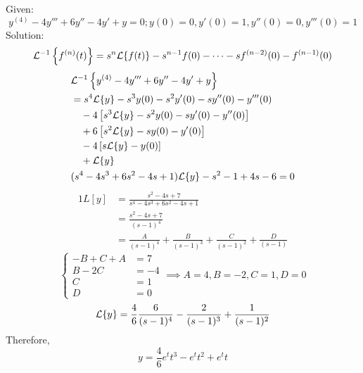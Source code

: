 \documentclass[diffeq.tex]{subfiles}
\begin{document}
\begin{homework*}[255.13]
    Given:
    \begin{equation}
        y^{(4)} - 4y''' + 6y'' - 4y' + y = 0; y(0) = 0, y'(0) = 1, y''(0) = 0, y'''(0) = 1
    \end{equation}
    Solution:
    \begin{equation}
        \mathcal{L}^{-1}\left\{f^{(n)}(t)\right\} = s^{n}\mathcal{L}\{f(t)\} - s^{n-1}f(0) - \dots - sf^{(n - 2)}(0)-f^{(n-1)}(0)
    \end{equation}
    \begin{alignat}{1}
        &\mathcal{L}^{-1}\left\{y^{(4)} - 4y''' + 6y'' - 4y' + y\right\}\\
        &= s^{4}\mathcal{L}\{y\} - s^{3}y(0) - s^{2}y'(0) - sy''(0) - y'''(0)\nonumber\\
        &\quad -4\left[s^{3}\mathcal{L}\{y\} - s^{2}y(0) - sy'(0) -y''(0)\right]\nonumber\\
        &\quad +6\left[s^{2}\mathcal{L}\{y\} - sy(0) - y'(0)\right]\nonumber\\
        &\quad -4\left[s\mathcal{L}\{y\}-y(0)\right]\nonumber\\
        &\quad + \mathcal{L}\{y\}\\
        &(s^{4}-4s^{3}+6s^{2}-4s+1)\mathcal{L}\{y\} - s^{2} - 1 + 4s - 6 = 0
    \end{alignat}
    \begin{alignat}{1}
        L[y] &= \frac{s^{2} - 4s + 7}{s^{4} - 4s^{3}+ 6s^{2} - 4s + 1}\\
        &= \frac{s^{2} - 4s + 7}{(s - 1)^{4}}\\
        &= \frac{A}{(s-1)^{4}} + \frac{B}{(s-1)^{3}} + \frac{C}{(s-1)^{2}} + \frac{D}{(s-1)}
    \end{alignat}
    \begin{equation}
        \begin{cases}
            -B + C + A &= 7\\
            B - 2C &= -4\\
            C &= 1\\
            D &= 0
        \end{cases}
        \implies A = 4, B = -2, C = 1, D = 0
    \end{equation}
    \begin{equation}
        \mathcal{L}\{y\} = \frac{4}{6}\frac{6}{(s - 1)^{4}}-\frac{2}{(s-1)^{3}}+\frac{1}{(s-1)^{2}}
    \end{equation}
    Therefore,
    \begin{equation}
        y = \frac{4}{6}e^{t}t^{3} - e^{t}t^{2} + e^{t}t
    \end{equation}
\end{homework*}
\end{document}
